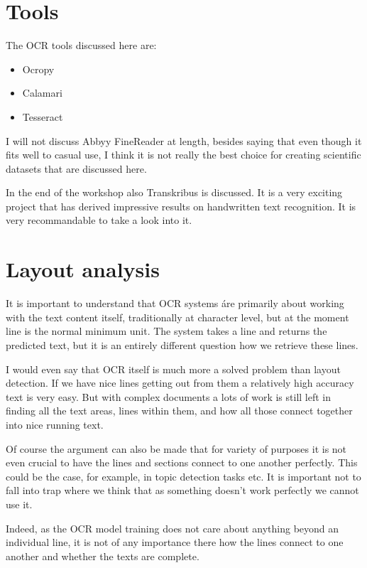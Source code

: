 \documentclass[]{book}
\providecommand{\tightlist}{%
  \setlength{\itemsep}{0pt}\setlength{\parskip}{0pt}}
\begin{document}
\hypertarget{tools}{%
\chapter{Tools}\label{tools}}

The OCR tools discussed here are:

\begin{itemize}
\tightlist
\item
  Ocropy
\item
  Calamari
\item
  Tesseract
\end{itemize}

I will not discuss Abbyy FineReader at length, besides saying that even though it fits well to casual use, I think it is not really the best choice for creating scientific datasets that are discussed here.

In the end of the workshop also Transkribus is discussed. It is a very exciting project that has derived impressive results on handwritten text recognition. It is very recommandable to take a look into it.

\hypertarget{layout}{%
\chapter{Layout analysis}\label{layout}}

It is important to understand that OCR systems áre primarily about working with the text content itself, traditionally at character level, but at the moment line is the normal minimum unit. The system takes a line and returns the predicted text, but it is an entirely different question how we retrieve these lines.

I would even say that OCR itself is much more a solved problem than layout detection. If we have nice lines getting out from them a relatively high accuracy text is very easy. But with complex documents a lots of work is still left in finding all the text areas, lines within them, and how all those connect together into nice running text.

Of course the argument can also be made that for variety of purposes it is not even crucial to have the lines and sections connect to one another perfectly. This could be the case, for example, in topic detection tasks etc. It is important not to fall into trap where we think that as something doesn't work perfectly we cannot use it.

Indeed, as the OCR model training does not care about anything beyond an individual line, it is not of any importance there how the lines connect to one another and whether the texts are complete.
\end{document}
